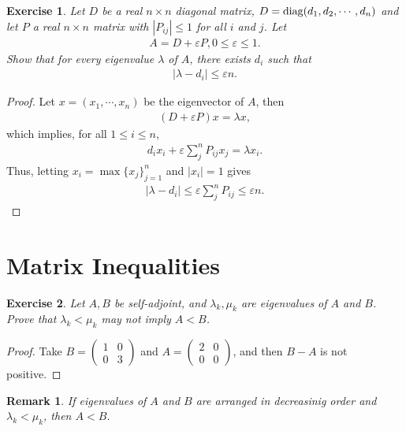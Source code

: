 \documentclass[11pt]{book}
\newtheorem{exercise}{Exercise}[section]
\newtheorem{remark}{Remark}[chapter]
\theoremstyle{definition}
\numberwithin{equation}{chapter}
\begin{document}
\begin{exercise}
Let $D$ be a real $n \times n$ diagonal matrix, $D = {\rm diag}(d_1, d_2, \cdots, d_n)$ and let $P$ a real $n \times n$ matrix with $|P_{ij}| \leq 1$ for all $i$ and $j$. Let
\begin{align*}
    A = D + \varepsilon P, 0 \leq \varepsilon \leq 1.
\end{align*}
Show that for every eigenvalue $\lambda$ of $A$, there exists $d_i$ such that 
\begin{align*}
    \left|\lambda - d_i \right| \leq \varepsilon n.
\end{align*}
\end{exercise}
\begin{proof}
Let $x = \left(x_1, \cdots, x_n\right)$ be the eigenvector of $A$, then 
\begin{align*}
    (D + \varepsilon P)x = \lambda x,
\end{align*}
which implies, for all $1\leq i \leq n$,
\begin{align*}
    d_i x_i + \varepsilon \sum^n_j P_{ij}x_j = \lambda x_i.
\end{align*}
Thus, letting $x_i = \max\{x_j\}^n_{j=1}$ and $\left|x_i\right| = 1$ gives
\begin{align*}
    \left|\lambda - d_i\right| \leq \varepsilon \sum^n_j P_{ij} \leq \varepsilon n.
\end{align*}
\end{proof}

\medskip

\section{Matrix Inequalities}

\begin{exercise}
Let $A, B$ be self-adjoint, and $\lambda_k, \mu_k$ are eigenvalues of $A$ and $B$. Prove that $\lambda_k < \mu_k$ may not imply $A < B$. 
\end{exercise}
\begin{proof}
Take $B = \begin{pmatrix} 1 & 0 \\ 0 & 3 \end{pmatrix}$ and $A = \begin{pmatrix} 2 & 0 \\ 0 & 0 \end{pmatrix}$, and then $B - A$ is not positive. 
\end{proof}

\begin{remark}
If eigenvalues of $A$ and $B$ are arranged in decreasinig order and $\lambda_k < \mu_k$, then $A < B$.
\end{remark}
\end{document}
